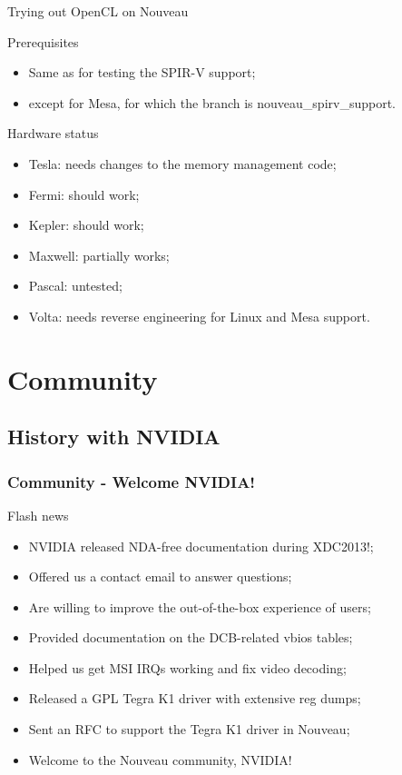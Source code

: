 \documentclass[11pt,english,compress]{beamer}
\begin{document}
\begin{frame}{Trying out OpenCL on Nouveau}
	\begin{block}{Prerequisites}
		\begin{itemize}
			\item Same as for testing the SPIR-V support;
			\item except for Mesa, for which the branch is
				nouveau\_spirv\_support.
		\end{itemize}
	\end{block}
	\begin{block}{Hardware status}
		\begin{itemize}
			\item Tesla: needs changes to the memory management
				code;
			\item Fermi: should work;
			\item Kepler: should work;
			\item Maxwell: partially works;
			\item Pascal: untested;
			\item Volta: needs reverse engineering for Linux and
				Mesa support.
		\end{itemize}
	\end{block}
\end{frame}

\section{Community}

\subsection{History with NVIDIA}
\begin{frame}
	\frametitle{Community - Welcome NVIDIA!}


	\begin{block}{Flash news}
		\begin{itemize}
			\item NVIDIA released NDA-free documentation during
XDC2013!;
			\item Offered us a contact email to answer questions;
			\item Are willing to improve the out-of-the-box
experience of users;
			\item Provided documentation on the DCB-related vbios
tables;
			\item Helped us get MSI IRQs working and fix video
decoding;
			\item Released a GPL Tegra K1 driver with extensive reg
dumps;
			\item Sent an RFC to support the Tegra K1 driver in Nouveau;
			\item Welcome to the Nouveau community, NVIDIA!
		\end{itemize}
	\end{block}
\end{frame}
\end{document}
